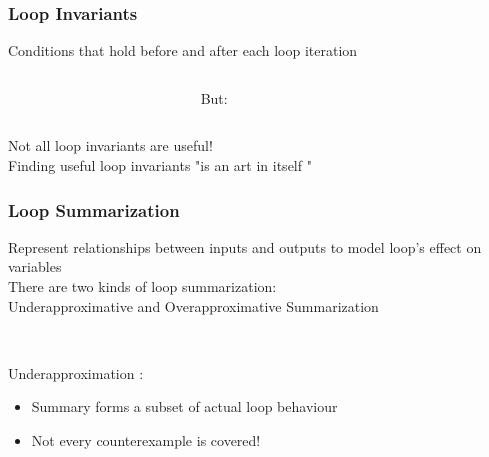 \begin{frame}[t]
	\frametitle{Loop Invariants}
	\begin{center}
		\onslide<+->
		Conditions that hold before and after each loop iteration		
		\begin{columns}[c]
		\begin{column}{0.38\textwidth}
			\onslide<+->
			\begin{figure}[h]
				\vspace*{0.5cm}
				\resizebox{0.65\textwidth}{!}{}
			\end{figure}
		\end{column}
			\onslide<+->
		\begin{column}{0.05\textwidth}
				But:
		\end{column}
		\begin{column}{0.38\textwidth}
			\begin{figure}[h]
				\vspace*{0.5cm}
				\resizebox{0.65\textwidth}{!}{}
			\end{figure}
		\end{column}
	\end{columns}
	\onslide<+->
	Not all loop invariants are useful! \\
	\onslide<+->
	Finding useful loop invariants "\color{emblue}is an art in itself \color{black}" \cite{DBLP:journals/fmsd/KroeningSTTW13}
	\end{center}
\end{frame}

\begin{frame}[t]
	\frametitle{Loop Summarization}
	\begin{center}
		\onslide<+->
		 Represent relationships between inputs and outputs to model loop's effect on variables \\ \vspace*{0.25cm}
		There are two kinds of loop summarization: \\
		\onslide<+-> \color{emblue}Underapproximative \color{black} and \color{emblue}Overapproximative \color{black} Summarization
		\begin{columns}[t]
			\begin{column}{0.35\textwidth}
				\vspace*{0.5cm} \\
				\onslide<+-> \color{emblue} Underapproximation \color{black}:
				\begin{itemize}
					\onslide<+-> \item Summary forms a subset of actual loop behaviour
					\onslide<+-> \item Not every counterexample is covered!
				\end{itemize}
			\end{column}
			\begin{column}{0.5\textwidth}
				\vspace*{0.5cm}
				\resizebox{\textwidth}{!}{}
			\end{column}
		\end{columns}
	\end{center}
\end{frame}

